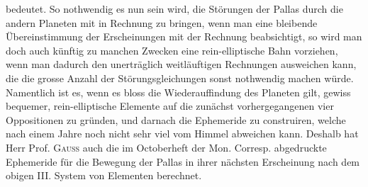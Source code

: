 \noindent bedeutet. So nothwendig es nun sein wird, die Störungen der Pallas durch die
andern Planeten mit in Rechnung zu bringen, wenn man eine bleibende Übereinstimmung
der Erscheinungen mit der Rechnung beabsichtigt, so wird man doch
auch künftig zu manchen Zwecken eine rein-elliptische Bahn vorziehen, wenn
man dadurch den unerträglich weitläuftigen Rechnungen ausweichen kann, die
die grosse Anzahl der Störungsgleichungen sonst nothwendig machen würde. Namentlich
ist es, wenn es bloss die Wiederauffindung des Planeten gilt, gewiss
bequemer, rein-elliptische Elemente auf die zunächst vorhergegangenen vier Oppositionen
zu gründen, und darnach die Ephemeride zu construiren, welche nach
einem Jahre noch nicht sehr viel vom Himmel abweichen kann. Deshalb hat
Herr Prof. \textsc{Gauss} auch die im Octoberheft der Mon. Corresp. abgedruckte Ephemeride
für die Bewegung der Pallas in ihrer nächsten Erscheinung nach dem
obigen III. System von Elementen berechnet.

